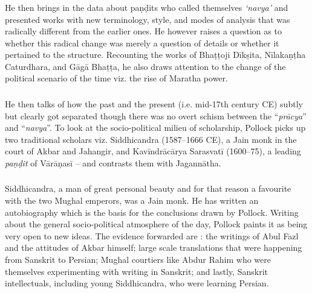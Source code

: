 \subsubsection{} He then brings in the data about paṇḍits who called themselves {\sl ‘navya’} and presented works with new terminology, style, and modes of analysis that was radically different from the earlier ones. He however raises a question as to whether this radical change was merely a question of details or whether it pertained to the structure. Recounting the works of Bhaṭṭoji Dīkṣita, Nīlakaṇṭha Caturdhara, and Gāgā Bhaṭṭa, he also draws attention to the change of the political scenario of the time viz. the rise of Maratha power.

\subsubsection{} He then talks of how the past and the present (i.e. mid-17th century CE) subtly but clearly got separated though there was no overt schism between the “{\sl prācya}” and “{\sl navya}”. To look at the socio-political milieu of scholarship, Pollock picks up two traditional scholars viz. Siddhicandra (1587--1666 CE), a Jain monk in the court of Akbar and Jahangir, and Kavīndrācārya Sarasvatī (1600--75), a leading {\sl paṇḍit} of Vārāṇasī -- and contrasts them with Jagannātha.

\subsubsection{} Siddhicandra, a man of great personal beauty and for that reason a favourite with the two Mughal emperors, was a Jain monk. He has written an autobiography which is the basis for the conclusions drawn by Pollock. Writing about the general socio-political atmosphere of the day, Pollock paints it as being very open to new ideas. The evidence forwarded are : the writings of Abul Fazl and the attitudes of Akbar himself; large scale translations that were happening from Sanskrit to Persian; Mughal courtiers like Abdur Rahim who were themselves experimenting with writing in Sanskrit; and lastly, Sanskrit intellectuals, including young Siddhicandra, who were learning Persian.

